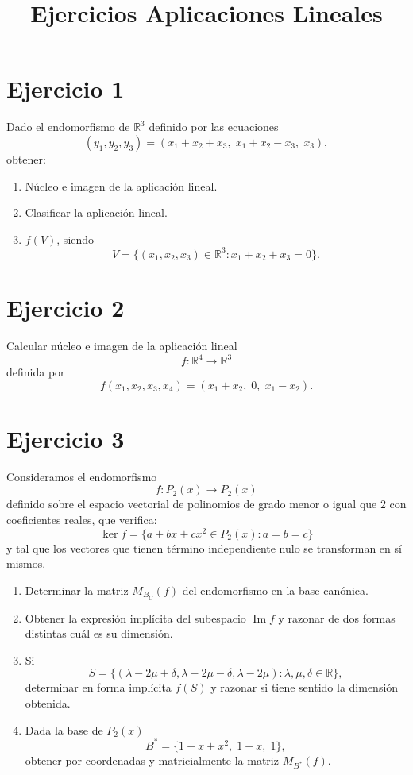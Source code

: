 \documentclass[12pt]{article}
\title{Ejercicios Aplicaciones Lineales}
\author{}
\begin{document}
\maketitle

\section*{Ejercicio 1}

Dado el endomorfismo de \(\mathbb{R}^3\) definido por las ecuaciones
\[
(y_1,y_2,y_3)=(x_1+x_2+x_3,\;x_1+x_2-x_3,\;x_3),
\]
obtener:

\begin{enumerate}
    \item[a)] Núcleo e imagen de la aplicación lineal.
    
    \item[b)] Clasificar la aplicación lineal.
    
    \item[c)] \(f(V)\), siendo
    \[
    V=\{(x_1,x_2,x_3)\in\mathbb{R}^3:x_1+x_2+x_3=0\}.
    \]
\end{enumerate}

\section*{Ejercicio 2}

Calcular núcleo e imagen de la aplicación lineal
\[
f:\mathbb{R}^4\longrightarrow \mathbb{R}^3
\]
definida por
\[
f(x_1,x_2,x_3,x_4)=(x_1+x_2,\;0,\;x_1-x_2).
\]

\section*{Ejercicio 3}

Consideramos el endomorfismo
\[
f:P_2(x)\longrightarrow P_2(x)
\]
definido sobre el espacio vectorial de polinomios de grado menor o igual que \(2\) con coeficientes reales, que verifica:
\[
\ker f=\{a+bx+cx^2\in P_2(x): a=b=c\}
\]
y tal que los vectores que tienen término independiente nulo se transforman en sí mismos.

\begin{enumerate}
    \item[a)] Determinar la matriz \(M_{B_C}(f)\) del endomorfismo en la base canónica.
    
    \item[b)] Obtener la expresión implícita del subespacio \(\operatorname{Im} f\) y razonar de dos formas distintas cuál es su dimensión.
    
    \item[c)] Si
    \[
    S=\{(\lambda-2\mu+\delta,\lambda-2\mu-\delta,\lambda-2\mu): \lambda,\mu,\delta\in\mathbb{R}\},
    \]
    determinar en forma implícita \(f(S)\) y razonar si tiene sentido la dimensión obtenida.
    
    \item[d)] Dada la base de \(P_2(x)\)
    \[
    B^*=\{1+x+x^2,\;1+x,\;1\},
    \]
    obtener por coordenadas y matricialmente la matriz \(M_{B^*}(f)\).
\end{enumerate}
\end{document}
